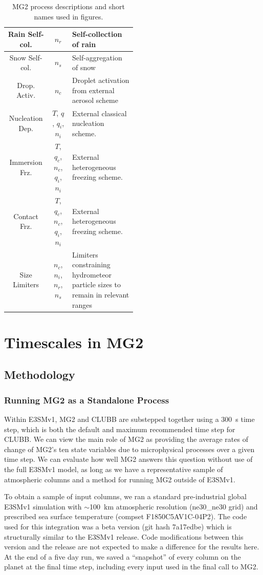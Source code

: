 \documentclass [11pt, proquest] {uwthesis}[2020/02/24]
\begin{document}
\begin{table}
\begin{tabular}{|c|c|p{0.5\linewidth}|}
    \hline
    Rain Self-col. & $n_r$ & Self-collection of rain \\
    \hline
    Snow Self-col. & $n_s$ & Self-aggregation of snow \\
    \hline
    Drop. Activ. & $n_c$ & Droplet activation from external aerosol scheme \\
    \hline
    Nucleation Dep. & $T$, $q$, $q_i$, $n_i$
        & External classical nucleation scheme. \\
    \hline
    Immersion Frz. & $T$, $q_c$, $n_c$, $q_i$, $n_i$
        & External heterogeneous freezing scheme. \\
    \hline
    Contact Frz. & $T$, $q_c$, $n_c$, $q_i$, $n_i$
        & External heterogeneous freezing scheme. \\
    \hline
    Size Limiters & $n_c$, $n_i$, $n_r$, $n_s$
        & Limiters constraining hydrometeor particle sizes to
          remain in relevant ranges \\
    \hline
  \end{tabular}
  \caption{MG2 process descriptions and short names used in figures.}
  \label{tab:processes}
\end{table}

\section{Timescales in MG2} \label{sec:MG2-timescales}

\subsection{Methodology}

\subsubsection{Running MG2 as a Standalone Process}
\label{sec:MG2-standalone}

Within E3SMv1, MG2 and CLUBB are substepped together using a \SI{300}{\second} time step, which is both the default and maximum recommended time step for CLUBB. We can view the main role of MG2 as providing the average rates of change of MG2's ten state variables due to microphysical processes over a given time step.  We can evaluate how well MG2 answers this question without use of the full E3SMv1 model, as long as we have a representative sample of atmospheric columns and a method for running MG2 outside of E3SMv1.

To obtain a sample of input columns, we ran a standard pre-industrial global E3SMv1 simulation with $\sim$\SI{100}{\kilo\meter} atmospheric resolution (ne30\_ne30 grid) and prescribed sea surface temperature (compset F1850C5AV1C-04P2). The code used for this integration was a beta version (git hash 7a17edbe) which is structurally similar to the E3SMv1 release. Code modifications between this version and the release are not expected to make a difference for the results here. At the end of a five day run, we saved a ``snapshot'' of every column on the planet at the final time step, including every input used in the final call to MG2.
\end{document}
